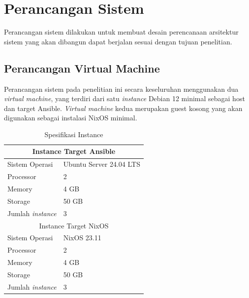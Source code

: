 \documentclass[10pt,]{report}
\begin{document}
\section{Perancangan Sistem}
\vspace{-3mm}
\begin{adjustwidth}{20pt}{}
	Perancangan sistem dilakukan untuk membuat desain perencanaan arsitektur
	sistem yang akan dibangun dapat berjalan sesuai dengan tujuan penelitian.
	\subsection{Perancangan Virtual Machine}
	\begin{adjustwidth}{20pt}{}
		Perancangan sistem pada penelitian ini secara keseluruhan menggunakan dua
		\textit{virtual machine}, yang terdiri dari satu \textit{instance} Debian
		12 minimal sebagai host dan target Ansible. \textit{Virtual machine} kedua
		merupakan guest kosong yang akan digunakan sebagai instalasi NixOS minimal.
	\end{adjustwidth}
	\begin{table}[!htbp]
		\caption{Spesifikasi Instance}
		\begin{center}

			\begin{tabular}{|l|l|}
				\hline
				\multicolumn{2}{|c|}{Instance Target Ansible}      \\
				\hline
				Sistem Operasi           & Ubuntu Server 24.04 LTS \\
				\hline
				Processor                & 2                       \\
				\hline
				Memory                   & 4 GB                    \\
				\hline
				Storage                  & 50 GB                   \\
				\hline
				Jumlah \textit{instance} & 3                       \\
				\hline
				\multicolumn{2}{|c|}{Instance Target NixOS}        \\
				\hline
				Sistem Operasi           & NixOS 23.11             \\
				\hline
				Processor                & 2                       \\
				\hline
				Memory                   & 4 GB                    \\
				\hline
				Storage                  & 50 GB                   \\
				\hline
				Jumlah \textit{instance} & 3                       \\
				\hline
			\end{tabular}
		\end{center}
	\end{table}

\end{adjustwidth}
\end{document}
